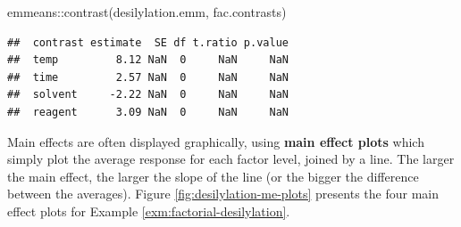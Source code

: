 \documentclass[
]{book}
\newenvironment{Shaded}{\begin{snugshade}}{\end{snugshade}}
\newcommand{\FunctionTok}[1]{\textcolor[rgb]{0.00,0.00,0.00}{#1}}
\newcommand{\NormalTok}[1]{#1}
\newcommand{\SpecialCharTok}[1]{\textcolor[rgb]{0.00,0.00,0.00}{#1}}
\newcommand{\StringTok}[1]{\textcolor[rgb]{0.31,0.60,0.02}{#1}}
\theoremstyle{definition}
\theoremstyle{definition}
\theoremstyle{definition}
\theoremstyle{definition}
\theoremstyle{remark}
\begin{document}
\begin{Shaded}
\begin{Highlighting}[]
\NormalTok{emmeans}\SpecialCharTok{::}\FunctionTok{contrast}\NormalTok{(desilylation.emm, }\StringTok{\textquotesingle{}fac.contrasts\textquotesingle{}}\NormalTok{)}
\end{Highlighting}
\end{Shaded}

\begin{verbatim}
##  contrast estimate  SE df t.ratio p.value
##  temp         8.12 NaN  0     NaN     NaN
##  time         2.57 NaN  0     NaN     NaN
##  solvent     -2.22 NaN  0     NaN     NaN
##  reagent      3.09 NaN  0     NaN     NaN
\end{verbatim}

Main effects are often displayed graphically, using \textbf{main effect plots} which simply plot the average response for each factor level, joined by a line. The larger the main effect, the larger the slope of the line (or the bigger the difference between the averages). Figure \ref{fig:desilylation-me-plots} presents the four main effect plots for Example \ref{exm:factorial-desilylation}.
\end{document}
